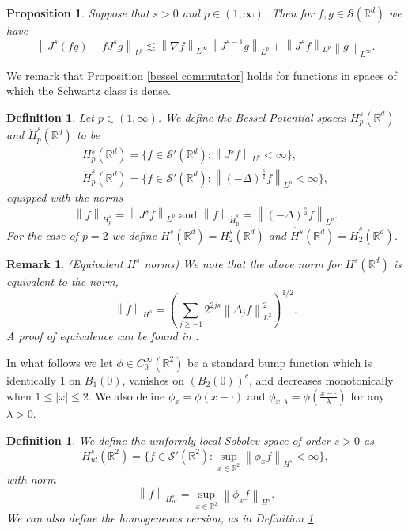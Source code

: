 \documentclass[12pt,xcolor=svgnames]{amsart}
\newtheorem{definition}[theorem]{Definition}
\newtheorem{proposition}[theorem]{Proposition}
\newtheorem{remark}[theorem]{Remark}
\newcommand{\R}{\mathbb{R}}
\newcommand{\abs}[1]{\mid\!#1\!\mid}
\newcommand{\norm}[2]{\left\lVert#1\right\rVert_{#2}}
\begin{document}
\begin{proposition} Suppose that $s>0$ and $p\in (1,\infty)$. Then for $f,g \in \mathcal{S}(\R^d)$ we have 
\begin{equation*}
\label{bessel commutator}
\norm{J^s(fg)-fJ^sg}{L^p} \lesssim \norm{\nabla f}{L^{\infty}}\norm{J^{s-1}g}{L^p}+\norm{J^s f}{L^p}\norm{g}{L^{\infty}}.
\end{equation*}
\end{proposition}
We remark that Proposition \ref{bessel commutator} holds for functions in spaces of which the Schwartz class is dense. 
\begin{definition}
\label{definion of bessel potential spaces}Let $p \in (1,\infty)$. We define the Bessel Potential spaces $H_p^{s}(\R^d)$ and $\dot{H}_p^s(\R^d)$ to be \begin{align*}
H_p^s(\R^d)=\{f \in \mathcal{S}'(\R^d) : \norm{J^sf}{L^p} <\infty\},\\
\dot{H}_p^s(\R^d)=\{f \in \mathcal{S}'(\R^d) : \norm{(-\Delta)^{\frac{s}{2}}f}{L^p} <\infty\},
\end{align*}
equipped with the norms $$\norm{f}{H_p^s} = \norm{J^sf}{L^p} \text{ and }\norm{f}{\dot{H}_p^s} = \norm{(-\Delta)^{\frac{s}{2}}f}{L^p}.$$
For the case of $p=2$ we define $H^s(\R^d)=H_2^{s}(\R^d)$ and $\dot{H^s}(\R^d)=\dot{H}_2^{s}(\R^d)$. 
\end{definition}


\begin{remark}(Equivalent $H^s$ norms) We note that the above norm for $H^s(\R^d)$ is equivalent to the norm,  
$$\norm{f}{H^s} = \left( \sum_{j \geq -1} 2^{2js}\norm{\Delta_j f}{L^2}^2\right)^{1/2}.$$
A proof of equivalence can be found in \cite{3}.

\end{remark}
In what follows we let $\phi \in C_0^{\infty}(\R^2)$ be a standard bump function which is identically $1$ on $B_1(0)$, vanishes on $(B_2(0))^c$, and decreases monotonically when $1 \leq \abs{x}\leq 2$. We also define $\phi_x = \phi(x - \cdot)$ and $\phi_{x,\lambda}=\phi\left(\frac{x-\cdot}{\lambda}\right)$ for any $\lambda>0$.

\begin{definition}
\label{Hsul definition} We define the uniformly local Sobolev space of order $s>0$ as
$$
H_{ul}^s(\R^2) = \{ f \in \mathcal{S}'(\R^2) : \sup_{x\in \R^2} \norm{\phi_x f}{H^s} < \infty\},
$$
with norm 
\begin{equation}
\label{hsul norm}
\norm{f}{H_{ul}^s} = \sup_{x \in \R^2}\norm{\phi_xf}{H^s}.
\end{equation}
We can also define the homogeneous version, as in Definition \ref{definion of bessel potential spaces}.
\end{definition}
\end{document}
